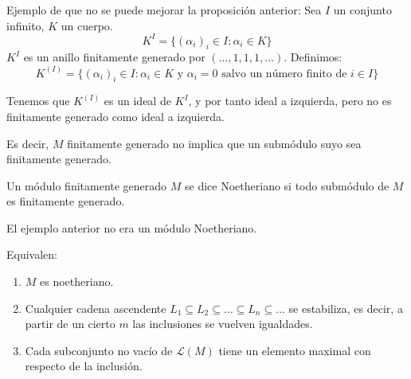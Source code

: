 Ejemplo de que no se puede mejorar la proposición anterior:
Sea \(I\) un conjunto infinito, \(K\) un cuerpo.
\[
  K^I=\{{(\alpha_i)}_i\in I:\alpha_i\in K\}
\]
\(K^I\) es un anillo finitamente generado
por \((\ldots,1,1,1,\ldots)\). Definimos:
\[
  K^{(I)}=\{{(\alpha_i)}_i\in I:\alpha_i\in K \textrm{ y } \alpha_i=0
  \textrm{ salvo un número finito de } i\in I\}
\]

Tenemos que \(K^{(I)}\) es un ideal de \(K^I\), y por tanto ideal a
izquierda, pero no es finitamente generado como ideal a izquierda.

Es decir, \(M\) finitamente generado no implica que un submódulo suyo
sea finitamente generado.

\begin{df}
  Un módulo finitamente generado \(M\) se dice Noetheriano si todo
  submódulo de \(M\) es finitamente generado.
\end{df}

El ejemplo anterior no era un módulo Noetheriano.

\begin{prop}
  Equivalen:
  \begin{enumerate}
    \item \(M\) es noetheriano.
    \item Cualquier cadena ascendente \(L_1\subseteq L_2\subseteq\ldots
      \subseteq L_n\subseteq\ldots\) se estabiliza, es decir,
      a partir de un cierto \(m\) las inclusiones se vuelven igualdades.
    \item Cada subconjunto no vacío de \(\mathcal{L}(M)\) tiene un elemento
      maximal con respecto de la inclusión.
  \end{enumerate}
\end{prop}

